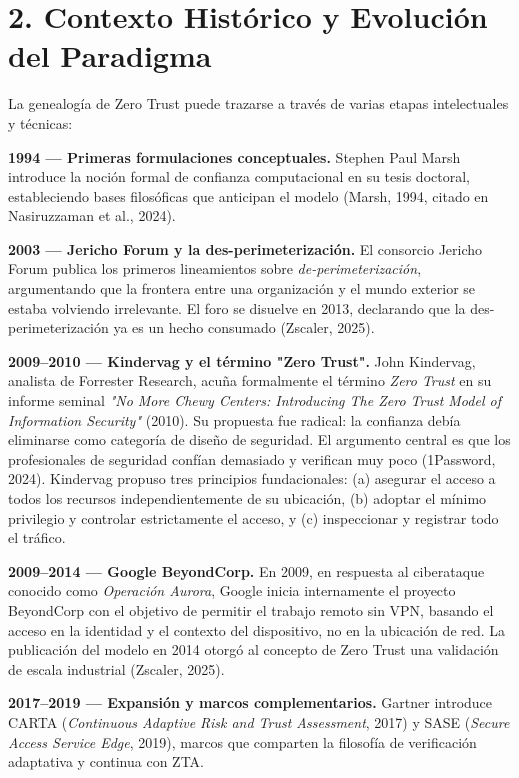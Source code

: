 \documentclass[12pt,a4paper]{article}
\begin{document}
\section{2. Contexto Histórico y Evolución del Paradigma}

La genealogía de Zero Trust puede trazarse a través de varias etapas intelectuales y técnicas:

\textbf{1994 — Primeras formulaciones conceptuales.} Stephen Paul Marsh introduce la noción formal de confianza computacional en su tesis doctoral, estableciendo bases filosóficas que anticipan el modelo (Marsh, 1994, citado en Nasiruzzaman et al., 2024).

\textbf{2003 — Jericho Forum y la des-perimeterización.} El consorcio Jericho Forum publica los primeros lineamientos sobre \textit{de-perimeterización}, argumentando que la frontera entre una organización y el mundo exterior se estaba volviendo irrelevante. El foro se disuelve en 2013, declarando que la des-perimeterización ya es un hecho consumado (Zscaler, 2025).

\textbf{2009–2010 — Kindervag y el término "Zero Trust".} John Kindervag, analista de Forrester Research, acuña formalmente el término \textit{Zero Trust} en su informe seminal \textit{"No More Chewy Centers: Introducing The Zero Trust Model of Information Security"} (2010). Su propuesta fue radical: la confianza debía eliminarse como categoría de diseño de seguridad. El argumento central es que los profesionales de seguridad confían demasiado y verifican muy poco (1Password, 2024). Kindervag propuso tres principios fundacionales: (a) asegurar el acceso a todos los recursos independientemente de su ubicación, (b) adoptar el mínimo privilegio y controlar estrictamente el acceso, y (c) inspeccionar y registrar todo el tráfico.

\textbf{2009–2014 — Google BeyondCorp.} En 2009, en respuesta al ciberataque conocido como \textit{Operación Aurora}, Google inicia internamente el proyecto BeyondCorp con el objetivo de permitir el trabajo remoto sin VPN, basando el acceso en la identidad y el contexto del dispositivo, no en la ubicación de red. La publicación del modelo en 2014 otorgó al concepto de Zero Trust una validación de escala industrial (Zscaler, 2025).

\textbf{2017–2019 — Expansión y marcos complementarios.} Gartner introduce CARTA (\textit{Continuous Adaptive Risk and Trust Assessment}, 2017) y SASE (\textit{Secure Access Service Edge}, 2019), marcos que comparten la filosofía de verificación adaptativa y continua con ZTA.
\end{document}
